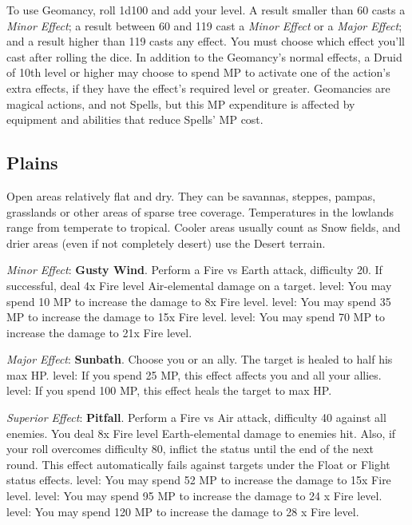 To use Geomancy, roll 1d100 and add your level. A result smaller than 60 casts a \textit{Minor Effect}; a result between 60 and 119 cast a \textit{Minor Effect} or a \textit{Major Effect}; and a result higher than 119 casts any effect.  You must choose which effect you'll cast after rolling the dice. In addition to the Geomancy’s normal  effects, a Druid of 10th level or higher may choose to spend MP to activate one of the action’s extra effects,  if they have the effect’s required level or greater. Geomancies are magical actions, and not Spells, but this  MP expenditure is affected by equipment and abilities that reduce Spells’ MP cost.

\begin{multicols}{2}
\subsection*{Plains}\label{subsec:geo-plains}
	
Open areas relatively flat and dry. They can be savannas, steppes, pampas, grasslands or other areas of sparse tree coverage. Temperatures in the  lowlands range from temperate to tropical. Cooler  areas usually count as Snow fields, and drier areas  (even if not completely desert) use the Desert  terrain.

\textit{Minor Effect}: \textbf{Gusty Wind}. Perform a Fire vs Earth attack, difficulty 20. If successful, deal 4x Fire level Air-elemental damage on a target.  level: You may spend 10 MP to increase the damage to 8x Fire level.  level: You may spend 35 MP to increase the damage to 15x Fire level.  level: You may spend 70 MP to increase the damage to 21x Fire level.

\textit{Major Effect}: \textbf{Sunbath}. Choose you or an ally. The target is healed to half his max HP\@.  level: If you spend 25 MP, this effect affects you and all your allies.  level: If you spend 100 MP, this effect heals the target to max HP\@. %

\textit{Superior Effect}: \textbf{Pitfall}. Perform a Fire vs Air attack, difficulty 40 against all enemies. You deal 8x Fire level Earth-elemental damage to enemies hit. Also, if your roll overcomes difficulty 80, inflict the  status until the end of the next round. This effect automatically fails against targets under the Float or Flight status effects.  level: You may spend 52 MP to increase the damage to 15x Fire level.  level: You may spend 95 MP to increase the damage to 24 x Fire level.  level: You may spend 120 MP to increase the damage to 28 x Fire level.


\end{multicols}
